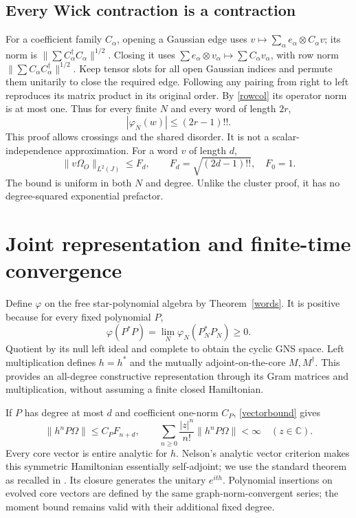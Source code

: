 \documentclass[11pt]{article}
\newcommand{\Om}{\Omega_O}
\newcommand{\ph}{\varphi}
\begin{document}
\subsection*{Every Wick contraction is a contraction}
For a coefficient family $C_\alpha$, opening a Gaussian edge
uses $v\mapsto\sum_\alpha e_\alpha\otimes C_\alpha v$;
its norm is $\|\sum C_\alpha^\dagger C_\alpha\|^{1/2}$.
Closing it uses $\sum e_\alpha\otimes v_\alpha\mapsto
\sum C_\alpha v_\alpha$, with row norm
$\|\sum C_\alpha C_\alpha^\dagger\|^{1/2}$.
Keep tensor slots for all open Gaussian indices and permute
them unitarily to close the required edge. Following any pairing
from right to left reproduces its matrix product in its original
order. By \eqref{rowcol} its operator norm is at most one.
Thus for every finite $N$ and every word of length $2r$,
\begin{equation}\label{allbound}
 |\ph_N(w)|\le(2r-1)!!.
\end{equation}
This proof allows crossings and the shared disorder. It is not
a scalar-independence approximation. For a word $v$ of length $d$,
\begin{equation}\label{vectorbound}
 \|v\Om\|_{L^2(J)}\le F_d,
 \qquad F_d=\sqrt{(2d-1)!!},\quad F_0=1.
\end{equation}
The bound is uniform in both $N$ and degree. Unlike the cluster
proof, it has no degree-squared exponential prefactor.

\newpage
\section{Joint representation and finite-time convergence}
Define $\ph$ on the free star-polynomial algebra by
Theorem~\ref{words}. It is positive because for every fixed
polynomial $P$,
\begin{equation}
 \ph(P^*P)=\lim_N\ph_N(P_N^*P_N)\ge0.
\end{equation}
Quotient by its null left ideal and complete to obtain the cyclic
GNS space. Left multiplication defines $h=h^*$ and the mutually
adjoint-on-the-core $M,M^\dagger$. This provides an all-degree
constructive representation through its Gram matrices and
multiplication, without assuming a finite closed Hamiltonian.

If $P$ has degree at most $d$ and coefficient one-norm $C_P$,
\eqref{vectorbound} gives
\begin{equation}
 \|h^nP\Omega\|\le C_P F_{n+d},\qquad
 \sum_{n\ge0}\frac{|z|^n}{n!}\|h^nP\Omega\|<\infty
 \quad(z\in\mathbb C).
\end{equation}
Every core vector is entire analytic for $h$. Nelson's analytic
vector criterion makes this symmetric Hamiltonian essentially
self-adjoint; we use the standard theorem as recalled in
\cite[Theorem~4.8]{Neeb}. Its closure generates the unitary
$e^{ith}$. Polynomial insertions on evolved core vectors are
defined by the same graph-norm-convergent series; the moment
bound remains valid with their additional fixed degree.
\end{document}
